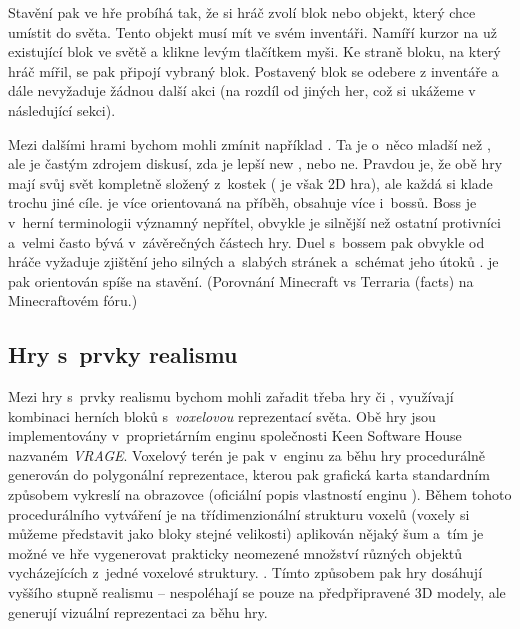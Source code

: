 \FloatBarrier

Stavění pak ve hře probíhá tak, že si hráč zvolí blok nebo objekt, který chce umístit do světa. Tento objekt musí mít ve svém inventáři. Namíří kurzor na už existující blok ve světě a klikne levým tlačítkem myši. Ke straně bloku, na který hráč mířil, se pak připojí vybraný blok. Postavený blok se odebere z inventáře a dále nevyžaduje žádnou další akci (na rozdíl od jiných her, což si ukážeme v následující sekci).


Mezi dalšími hrami bychom mohli zmínit například \TE{}. Ta je o~něco mladší než \MC{}, ale je častým zdrojem diskusí, zda je lepší new \MC{}, nebo ne. Pravdou je, že obě hry mají svůj svět kompletně složený z~kostek (\TE{} je však 2D hra), ale každá si klade trochu jiné cíle. \TE{} je více orientovaná na příběh, obsahuje více \NPC{} i~bossů. Boss je v~herní terminologii významný nepřítel, obvykle je silnější než ostatní protivníci a~velmi často bývá v~závěrečných částech hry. Duel s~bossem pak obvykle od hráče vyžaduje zjištění jeho silných a~slabých stránek a~schémat jeho útoků \citep{intro_boss}. \MC{} je pak orientován spíše na stavění. (Porovnání Minecraft vs Terraria (facts) \citep{mc_te_comparsion} na Minecraftovém fóru.)


\subsection{Hry s~prvky realismu}

Mezi hry s~prvky realismu bychom mohli zařadit třeba hry \SE{} či \ME{}, využívají kombinaci herních bloků s~\textit{voxelovou} reprezentací světa. Obě hry jsou implementovány v~proprietárním enginu společnosti Keen Software House nazvaném \textit{VRAGE}\texttrademark{}. Voxelový terén je pak v~enginu za běhu hry procedurálně generován do polygonální reprezentace, kterou pak grafická karta standardním způsobem vykreslí na obrazovce (oficiální popis vlastností enginu \citep{vrage}). Během tohoto procedurálního vytváření je na třídimenzionální strukturu voxelů (voxely si můžeme představit jako bloky stejné velikosti) aplikován nějaký šum a~tím je možné ve hře vygenerovat prakticky neomezené množství různých objektů vycházejících z~jedné voxelové struktury.  \citep{rosa_blog}. Tímto způsobem pak hry dosáhují vyššího stupně realismu -- nespoléhají se pouze na předpřipravené 3D modely, ale generují vizuální reprezentaci za běhu hry. 

